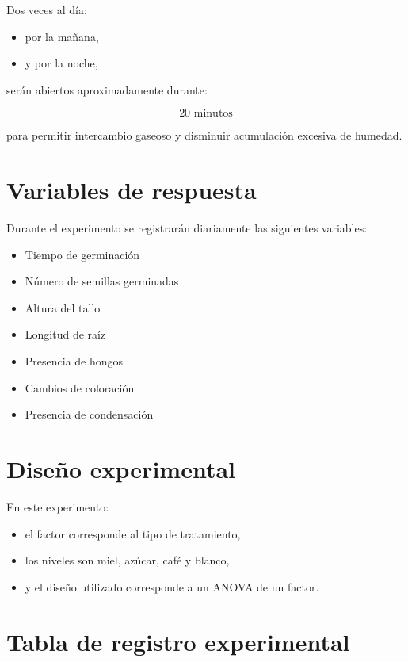 \documentclass[compacto,10pt,comentarios]{aleph-notas}
\begin{document}
Dos veces al día:

\begin{itemize}
\item por la mañana,
\item y por la noche,
\end{itemize}

serán abiertos aproximadamente durante:

\[
20 \text{ minutos}
\]

para permitir intercambio gaseoso y disminuir acumulación excesiva de humedad.

\section{Variables de respuesta}

Durante el experimento se registrarán diariamente las siguientes variables:

\begin{itemize}
\item Tiempo de germinación
\item Número de semillas germinadas
\item Altura del tallo
\item Longitud de raíz
\item Presencia de hongos
\item Cambios de coloración
\item Presencia de condensación
\end{itemize}

\section{Diseño experimental}

En este experimento:

\begin{itemize}
\item el factor corresponde al tipo de tratamiento,
\item los niveles son miel, azúcar, café y blanco,
\item y el diseño utilizado corresponde a un ANOVA de un factor.
\end{itemize}

\section{Tabla de registro experimental}
\end{document}
